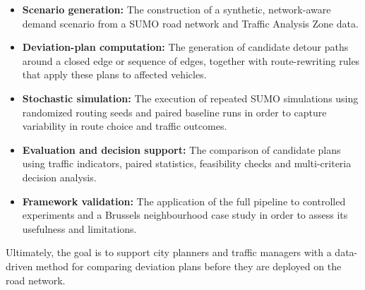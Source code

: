\begin{itemize}
    \item \textbf{Scenario generation:} The construction of a synthetic, network-aware demand scenario from a SUMO road network and Traffic Analysis Zone data.
    \item \textbf{Deviation-plan computation:} The generation of candidate detour paths around a closed edge or sequence of edges, together with route-rewriting rules that apply these plans to affected vehicles.
    \item \textbf{Stochastic simulation:} The execution of repeated SUMO simulations using randomized routing seeds and paired baseline runs in order to capture variability in route choice and traffic outcomes.
    \item \textbf{Evaluation and decision support:} The comparison of candidate plans using traffic indicators, paired statistics, feasibility checks and multi-criteria decision analysis.
    \item \textbf{Framework validation:} The application of the full pipeline to controlled experiments and a Brussels neighbourhood case study in order to assess its usefulness and limitations.
\end{itemize}

Ultimately, the goal is to support city planners and traffic managers with a data-driven method for comparing deviation plans before they are deployed on the road network.
